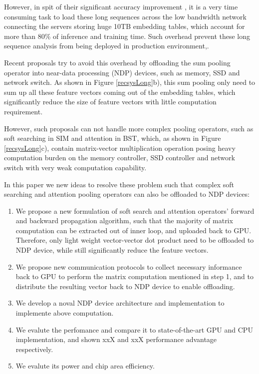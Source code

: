 \documentclass[conference]{IEEEtran}
\begin{document}
However,
in spit of their significant accuracy improvement \cite{recsys_sim_alibaba},
it is a very time consuming task to load these long sequences across the low bandwidth network connecting
the servers storing huge 10TB embedding tables\cite{ recsys_baidu_aibox },
which account for more than 80\% of inference
\cite{recsys_archimp_facebook_hpca20 ,recsys_deeprecsys_facebook_isca20 } 
and training \cite{recsys_traineff_facebook_hpca21 } time.
Such overhead prevent these long sequence analysis from being deployed in production environment\cite{recsys_sim_alibaba},.

Recent proposals try to avoid this overhead by offloading the sum pooling operator into near-data processing (NDP) devices,
such as memory\cite{recacc_tensordimm_kaist_micro19 ,recacc_recnmp_facebook_isca20 , recacc_tensorcasting_kaist_hpca21 }, 
SSD \cite{recacc_recssd_kaist_asplos21 } and  network switch\cite{ recacc_fafnir_hpca21 }.
As shown in Figure \ref{recsysLong}b),
this sum pooling only need to sum up all these feature vectors coming out of the embedding tables,
which significantly reduce the size of feature vectors with little computation requirement.

However,
such proposals can not handle more complex pooling operators, 
such as soft searching in SIM \cite{recsys_sim_alibaba}
and attention in BST\cite{recsys_bst_alibaba},
which, as shown in Figure \ref{recsysLong}c),
contain matrix-vector multiplication operation posing 
heavy computation burden on the memory controller, SSD controller and network switch with 
very weak computation capability.

In this paper we new ideas to resolve these problem
such that complex soft searching and attention pooling operators can also be offloaded to NDP devices:
\begin{enumerate}
\item We propose  a new formulation of soft search and attention operators' forward and backward propagation algorithm,
such that the majority of matrix computation can be extracted out of inner loop,
and uploaded back to GPU.
Therefore,
only light weight vector-vector dot product need to be offloaded to NDP device,
while still significantly reduce the feature vectors.
\item We propose new communication protocols to collect necessary informance back to GPU to perform the matrix computation mentioned in step 1,
and to distribute the resulting vector back to NDP device to enable offloading.
\item We develop a noval NDP device architecture and implementation to implemente above computation.
\item We evalute the perfomance and compare it to state-of-the-art GPU and CPU implementation, and shown xxX and xxX performance advantage respectively.
\item We evalute its power and chip area efficiency.
\end{enumerate}
\end{document}
